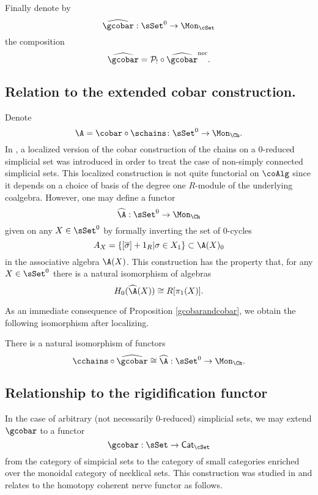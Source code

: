 Finally denote by $$\widehat{\gcobar}: \sSet^0 \to \Mon_{\cSet}$$ the composition $$\widehat{\gcobar}= \mathcal{P}_{!} \circ \widehat{\gcobar}^{\text{nec}}.$$ 

\subsection{Relation to the extended cobar construction.}

Denote $$\A= \cobar \circ \schains \colon \sSet^0 \to \Mon_{\Ch}.$$ In \cite{hess2010cobar}, a localized version of the cobar construction of the chains on a $0$-reduced simplicial set was introduced in order to treat the case of non-simply connected simplicial sets. This localized construction is not quite functorial on $\coAlg$ since it depends on a choice of basis of the degree one $R$-module of the underlying coalgebra. However, one may define a functor $$\widehat{\A}: \sSet^0 \to \Mon_{\Ch}$$
given on any $X \in \sSet^0$ by formally inverting the set of $0$-cycles $$A_X=\{ [\overline{\sigma}]+1_R | \sigma \in X_1 \} \subset \A(X)_0$$ in the associative algebra $\A(X)$. This construction has the property that, for any $X \in \sSet^0$ there is a natural isomorphism of algebras $$H_0(\widehat{\A}(X)) \cong R[\pi_1(X)].$$





As an immediate consequence of Proposition \ref{gcobarandcobar}, we obtain the following isomorphism after localizing.

\begin{corollary}\label{localizedcobar}
There is a natural isomorphism of functors
$$\cchains \circ \widehat{\gcobar} \cong \widehat{\A} :\sSet^0 \to \Mon_{\Ch}.$$ 
\end{corollary}

\subsection{Relationship to the rigidification functor}

In the case of arbitrary (not necessarily $0$-reduced) simplicial sets, we may extend  $\gcobar$ to a functor
$$\gcobar: \sSet \to \mathsf{Cat}_{\cSet}$$ from the category of simpicial sets to the category of small categories enriched over the monoidal category of necklical sets. This construction was studied in \cite{rivera2018cubical} and relates to the homotopy coherent nerve functor as follows. 


